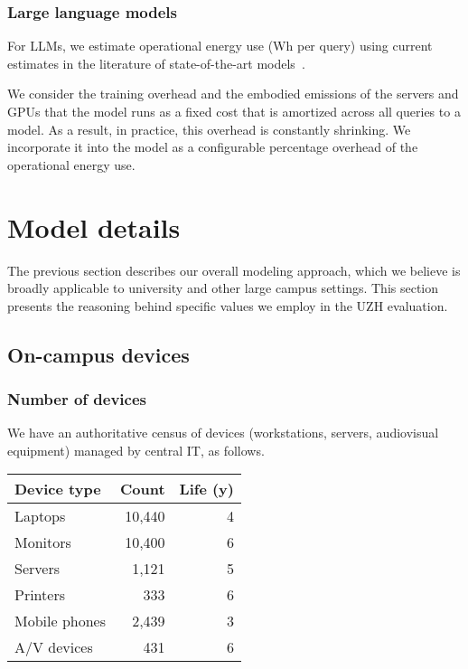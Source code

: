 \documentclass[11pt]{article}
\begin{document}
\subsubsection*{Large language models}

For LLMs, we estimate operational energy use (Wh per query) using current estimates in the literature of state-of-the-art models~\cite{devries2023growing,epoch2025howmuchenergydoeschatgptuse}.

We consider the training overhead and the embodied emissions of the servers and GPUs that the model runs as a fixed cost that is amortized across all queries to a model. As a result, in practice, this overhead is constantly shrinking. We incorporate it into the model as a configurable percentage overhead of the operational energy use.

\section{Model details}
\label{sec:model:details}

The previous section describes our overall modeling approach, which we believe is broadly applicable to university and other large campus settings. This section presents the reasoning behind specific values we employ in the UZH evaluation.

\subsection{On-campus devices}

\subsubsection*{Number of devices}

We have an authoritative census of devices (workstations, servers, audiovisual equipment) managed by central IT, as follows.

\begin{center}
  \begin{tabular}{|l|r|r|}
    \hline
    \textbf{Device type} & \textbf{Count} & \textbf{Life (y)}\\ \hline
    Laptops & 10,440 & 4 \\
    Monitors & 10,400 & 6 \\
    Servers & 1,121 & 5 \\
    Printers & 333 & 6 \\
    Mobile phones & 2,439 & 3 \\
    A/V devices & 431 & 6 \\ \hline
  \end{tabular}
  \label{tab:oncampusdevices}
\end{center}
\end{document}
